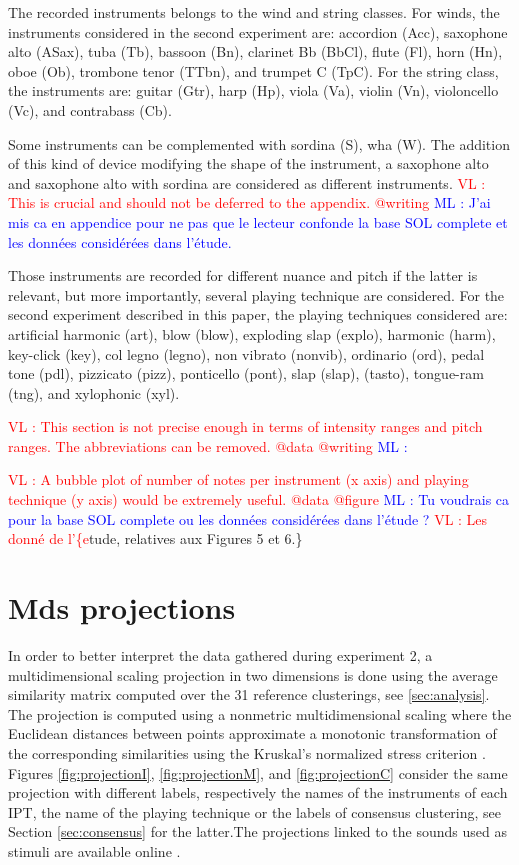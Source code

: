 \documentclass{article}
\newcommand{\ipt}{IPT\xspace}
\newcommand{\ml}[1]{\textcolor{blue}{ML : #1}}
\newcommand{\vl}[1]{\textcolor{red}{VL : #1}}
\begin{document}
The recorded instruments belongs to the wind and string classes. For winds, the instruments considered in the second experiment are: accordion (Acc), saxophone alto (ASax), tuba (Tb), bassoon (Bn), clarinet Bb (BbCl), flute (Fl), horn (Hn), oboe (Ob), trombone tenor (TTbn), and trumpet C (TpC). For the string class, the instruments are: guitar (Gtr), harp (Hp), viola (Va), violin (Vn), violoncello (Vc), and contrabass (Cb).

Some instruments can be complemented with sordina (S), wha (W). The addition of this kind of device modifying the shape of the instrument, a saxophone alto and saxophone alto with sordina are considered as different instruments.
\vl{This is crucial and should not be deferred to the appendix. @writing}
\ml{J'ai mis ca en appendice pour ne pas que le lecteur confonde la base SOL complete et les données considérées dans l'étude.}

Those instruments are recorded for different nuance and pitch if the latter is relevant, but more importantly, several playing technique are considered. For  the second experiment described in this paper, the playing techniques considered are: artificial harmonic (art), blow (blow), exploding slap  (explo), harmonic (harm), key-click (key), col legno   (legno), non vibrato (nonvib), ordinario (ord), pedal tone (pdl), pizzicato (pizz), ponticello (pont), slap (slap), (tasto), tongue-ram (tng), and xylophonic (xyl).

\vl{This section is not precise enough in terms of intensity ranges and pitch ranges.
The abbreviations can be removed. @data @writing}
\ml{}

\vl{A bubble plot of number of notes per instrument (x axis) and playing technique
(y axis) would be extremely useful. @data @figure}
\ml{Tu voudrais ca pour la base SOL complete ou les données considérées dans l'étude ?}
\vl{Les donn\'{e} de l'\{e}tude, relatives aux Figures 5 et 6.\}


\section{Mds projections}

In order to better interpret the data gathered during experiment 2, a multidimensional scaling projection in two dimensions is done using the average similarity matrix computed over the 31 reference clusterings, see \ref{sec:analysis}. The projection is computed  using a nonmetric multidimensional scaling where the Euclidean distances between points  approximate a monotonic transformation of the corresponding similarities using the Kruskal's normalized stress criterion \cite{kruskal1978multidimensional}. Figures \ref{fig:projectionI}, \ref{fig:projectionM}, and \ref{fig:projectionC} consider the same projection with different labels, respectively the names of the instruments of each \ipt, the name of the playing technique or the labels of consensus clustering, see Section \ref{sec:consensus} for the latter.The projections linked to the sounds used as stimuli are available  online \url{}.
\end{document}
